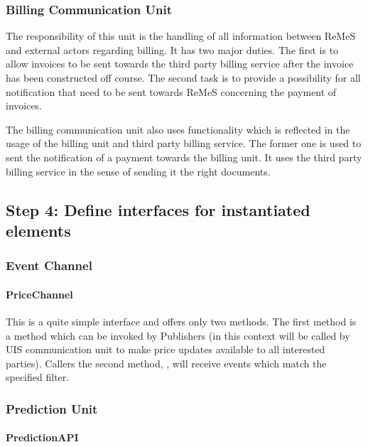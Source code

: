 \subsubsection{Billing Communication Unit}

\npar The responsibility of this unit is the handling of all information between
ReMeS and external actors regarding billing. It has two major duties. The first
is to allow invoices to be sent towards the third party billing service after
the invoice has been constructed off course. The second task is to provide a
possibility for all notification that need to be sent towards ReMeS concerning
the payment of invoices.

\npar The billing communication unit also uses functionality which is reflected
in the usage of the billing unit and third party billing service. The former one
is used to sent the notification of a payment towards the billing unit. It uses
the third party billing service in the sense of sending it the right documents.

\subsection{Step 4: Define interfaces for instantiated elements}
\label{add:it9/interfaces}

\subsubsection{Event Channel}

\paragraph{PriceChannel}
\npar This is a quite simple interface and offers only two methods. The first
method is a  method which can be invoked by
Publishers (in this context  will be called by UIS communication
unit to make price updates available to all interested parties). Callers the
second method, , will receive events which
match the specified filter.

\subsubsection{Prediction Unit}

\paragraph{PredictionAPI}

